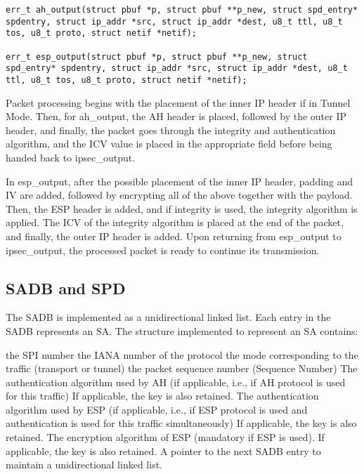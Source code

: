 \noindent
\begin{minipage}[t]{\linewidth}
\begin{lstlisting}[style=mycodestyle, label={lst:ah_esp_out_interface}, caption={AH and ESP outbound  processing interfaces}]
err_t ah_output(struct pbuf *p, struct pbuf **p_new, struct spd_entry* spdentry, struct ip_addr *src, struct ip_addr *dest, u8_t ttl, u8_t tos, u8_t proto, struct netif *netif);

err_t esp_output(struct pbuf *p, struct pbuf **p_new, struct spd_entry* spdentry, struct ip_addr *src, struct ip_addr *dest, u8_t ttl, u8_t tos, u8_t proto, struct netif *netif);
\end{lstlisting}
\end{minipage}

Packet processing begins with the placement of the inner IP header if in Tunnel Mode. Then, for ah\_output, the AH header is placed, followed by the outer IP header, and finally, the packet goes through the integrity and authentication algorithm, and the ICV value is placed in the appropriate field before being handed back to ipsec\_output.

In esp\_output, after the possible placement of the inner IP header, padding and IV are added, followed by encrypting all of the above together with the payload. Then, the ESP header is added, and if integrity is used, the integrity algorithm is applied. The ICV of the integrity algorithm is placed at the end of the packet, and finally, the outer IP header is added. Upon returning from esp\_output to ipsec\_output, the processed packet is ready to continue its transmission.


\subsection{SADB and SPD}
The SADB is implemented as a unidirectional linked list. Each entry in the SADB represents an SA. The structure implemented to represent an SA contains:

\begin{outline}
\1 the SPI number
\1 the IANA number of the protocol
\1 the mode corresponding to the traffic (transport or tunnel)
\1 the packet sequence number (Sequence Number)
\1 The authentication algorithm used by AH (if applicable, i.e., if AH protocol \1 is used for this traffic)
\1 If applicable, the key is also retained.
\1 The authentication algorithm used by ESP (if applicable, i.e., if ESP \1 protocol is used and authentication is used for this traffic simultaneously)
\1 If applicable, the key is also retained.
\1 The encryption algorithm of ESP (mandatory if ESP is used).
\1 If applicable, the key is also retained.
\1 A pointer to the next SADB entry to maintain a unidirectional linked list.
\end{outline}

